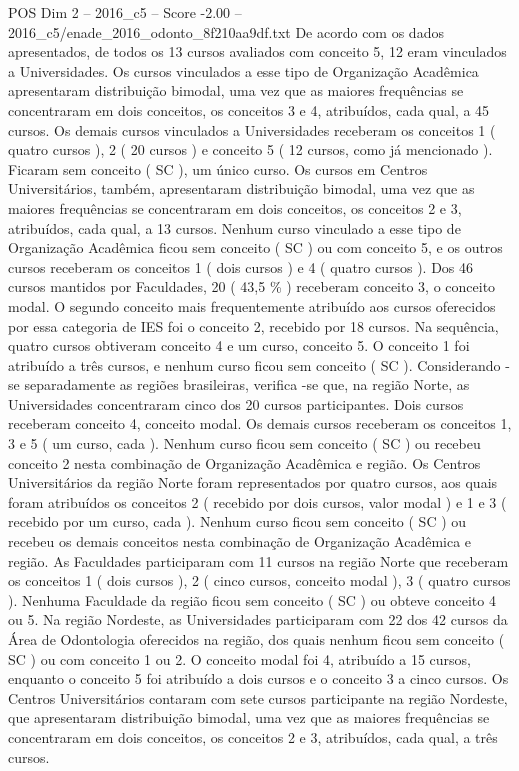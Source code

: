 \begin{textsample}{POS Dim 2 – 2016\_c5 – Score -2.00 – 2016\_c5/enade\_2016\_odonto\_8f210aa9df.txt}
De acordo com os dados apresentados, de todos os 13 cursos avaliados com conceito 5, 12 eram vinculados a Universidades.
Os cursos vinculados a esse tipo de Organização Acadêmica apresentaram distribuição bimodal, uma vez que as maiores frequências se concentraram em dois conceitos, os conceitos 3 e 4, atribuídos, cada qual, a 45 cursos.
Os demais cursos vinculados a Universidades receberam os conceitos 1 ( quatro cursos ), 2 ( 20 cursos ) e conceito 5 ( 12 cursos, como já mencionado ).
Ficaram sem conceito ( SC ), um único curso.
Os cursos em Centros Universitários, também, apresentaram distribuição bimodal, uma vez que as maiores frequências se concentraram em dois conceitos, os conceitos 2 e 3, atribuídos, cada qual, a 13 cursos.
Nenhum curso vinculado a esse tipo de Organização Acadêmica ficou sem conceito ( SC ) ou com conceito 5, e os outros cursos receberam os conceitos 1 ( dois cursos ) e 4 ( quatro cursos ).
Dos 46 cursos mantidos por Faculdades, 20 ( 43,5 \% ) receberam conceito 3, o conceito modal.
O segundo conceito mais frequentemente atribuído aos cursos oferecidos por essa categoria de IES foi o conceito 2, recebido por 18 cursos.
Na sequência, quatro cursos obtiveram conceito 4 e um curso, conceito 5.
O conceito 1 foi atribuído a três cursos, e nenhum curso ficou sem conceito ( SC ).
Considerando -se separadamente as regiões brasileiras, verifica -se que, na região Norte, as Universidades concentraram cinco dos 20 cursos participantes.
Dois cursos receberam conceito 4, conceito modal.
Os demais cursos receberam os conceitos 1, 3 e 5 ( um curso, cada ).
Nenhum curso ficou sem conceito ( SC ) ou recebeu conceito 2 nesta combinação de Organização Acadêmica e região.
Os Centros Universitários da região Norte foram representados por quatro cursos, aos quais foram atribuídos os conceitos 2 ( recebido por dois cursos, valor modal ) e 1 e 3 ( recebido por um curso, cada ).
Nenhum curso ficou sem conceito ( SC ) ou recebeu os demais conceitos nesta combinação de Organização Acadêmica e região.
As Faculdades participaram com 11 cursos na região Norte que receberam os conceitos 1 ( dois cursos ), 2 ( cinco cursos, conceito modal ), 3 ( quatro cursos ).
Nenhuma Faculdade da região ficou sem conceito ( SC ) ou obteve conceito 4 ou 5.
Na região Nordeste, as Universidades participaram com 22 dos 42 cursos da Área de Odontologia oferecidos na região, dos quais nenhum ficou sem conceito ( SC ) ou com conceito 1 ou 2.
O conceito modal foi 4, atribuído a 15 cursos, enquanto o conceito 5 foi atribuído a dois cursos e o conceito 3 a cinco cursos.
Os Centros Universitários contaram com sete cursos participante na região Nordeste, que apresentaram distribuição bimodal, uma vez que as maiores frequências se concentraram em dois conceitos, os conceitos 2 e 3, atribuídos, cada qual, a três cursos.

\end{textsample}
